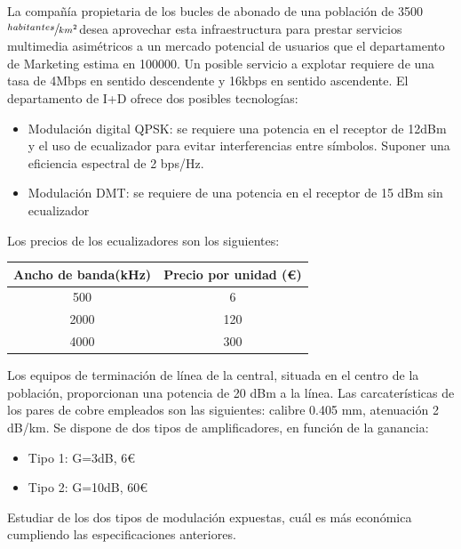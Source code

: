 \begin{exercise}[3]
La compañía propietaria de los bucles de abonado de una población de 3500$\sfrac{habitantes}{km^2}$desea aprovechar esta infraestructura para prestar servicios multimedia asimétricos a un mercado potencial de usuarios que el departamento de Marketing estima en 100000. Un posible servicio a explotar requiere de una tasa de 4Mbps en sentido descendente y 16kbps en sentido ascendente. El departamento de I+D ofrece dos posibles tecnologías:
\begin{itemize}
	\item Modulación digital QPSK: se requiere una potencia en el receptor de 12dBm y el uso de ecualizador para evitar interferencias entre símbolos. Suponer una eficiencia espectral de 2 bps/Hz.
	\item Modulación DMT: se requiere de una potencia en el receptor de 15 dBm sin ecualizador
\end{itemize}
Los precios de los ecualizadores son los siguientes:
\begin{center}
\begin{tabular}{|c c|}
\hline
	Ancho de banda(kHz) & Precio por unidad (€)\\\hline
	500 & 6\\\hline
	2000 & 120\\\hline
	4000 & 300\\\hline
\end{tabular}
\end{center}
Los equipos de terminación de línea de la central, situada en el centro de la población, proporcionan una potencia de 20 dBm a la línea. Las carcaterísticas de los pares de cobre empleados son las siguientes: calibre 0.405 mm, atenuación 2 dB/km. Se dispone de dos tipos de amplificadores, en función de la ganancia:
\begin{itemize}
	\item Tipo 1: G=3dB, 6€
	\item Tipo 2: G=10dB, 60€
\end{itemize}
Estudiar de los dos tipos de modulación expuestas, cuál es más económica cumpliendo las especificaciones anteriores.
\end{exercise}
